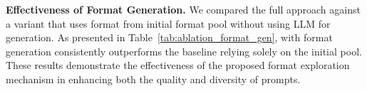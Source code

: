 \noindent \textbf{Effectiveness of Format Generation.}
We compared the full \sysname{} approach against a variant that uses format from initial format pool without using LLM for generation.
As presented in Table~\ref{tab:ablation_format_gen}, \sysname{} with format generation consistently outperforms the baseline relying solely on the initial pool.
These results demonstrate the effectiveness of the proposed format exploration mechanism in enhancing both the quality and diversity of prompts.

\begin{table}[h]
  \centering
  \vspace{-1ex}
  \caption{Impact of format generation during prompt optimization.}
  \label{tab:ablation_scoring}
  \vspace{-2ex}
\end{table}

